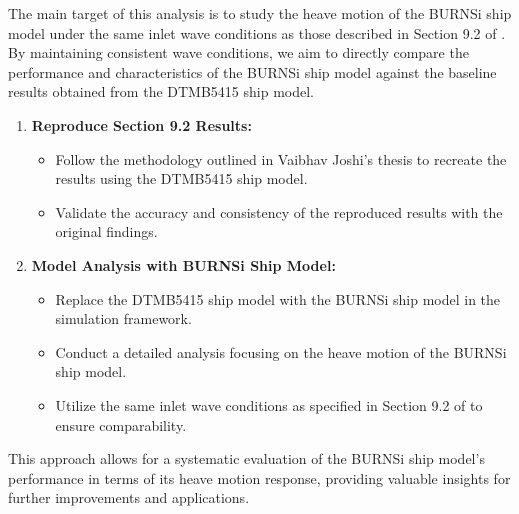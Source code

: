 \documentclass[12pt]{article} %
\begin{document}
The main target of this analysis is to study the heave motion of the BURNSi ship model under the same inlet wave conditions as those described in Section 9.2 of \cite{joshi2018}. By maintaining consistent wave conditions, we aim to directly compare the performance and characteristics of the BURNSi ship model against the baseline results obtained from the DTMB5415 ship model.

\begin{enumerate}
    \item \textbf{Reproduce Section 9.2 Results:}
    \begin{itemize}
        \item Follow the methodology outlined in Vaibhav Joshi's thesis to recreate the results using the DTMB5415 ship model.
        \item Validate the accuracy and consistency of the reproduced results with the original findings.
    \end{itemize}
    \item \textbf{Model Analysis with BURNSi Ship Model:}
    \begin{itemize}
        \item Replace the DTMB5415 ship model with the BURNSi ship model in the simulation framework.
        \item Conduct a detailed analysis focusing on the heave motion of the BURNSi ship model.
        \item Utilize the same inlet wave conditions as specified in Section 9.2 of \cite{joshi2018} to ensure comparability.
    \end{itemize}
\end{enumerate}

This approach allows for a systematic evaluation of the BURNSi ship model's performance in terms of its heave motion response, providing valuable insights for further improvements and applications.
\end{document}
